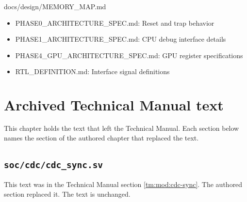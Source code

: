 \begin{relocated}{docs/design/MEMORY_MAP.md}
\begin{itemize}
\tightlist
\item
  PHASE0\_\allowbreak{}ARCHITECTURE\_\allowbreak{}SPEC.md: Reset and
  trap behavior
\item
  PHASE1\_\allowbreak{}ARCHITECTURE\_\allowbreak{}SPEC.md: CPU debug
  interface details
\item
  PHASE4\_\allowbreak{}GPU\_\allowbreak{}ARCHITECTURE\_\allowbreak{}SPEC.md:
  GPU register specifications
\item
  RTL\_\allowbreak{}DEFINITION.md: Interface signal definitions
\end{itemize}
\end{relocated}

\chapter{Archived Technical Manual text}\label{cr:ch:source-archive-tm}

This chapter holds the text that left the Technical Manual. Each section below names the section of the authored chapter that replaced the text.

\section{\texttt{soc/cdc/cdc\_sync.sv}}\label{cr:arc:tm-cdc-sync}

This text was in the Technical Manual section \cref{tm:mod:cdc-sync}. The authored section replaced it. The text is unchanged.

